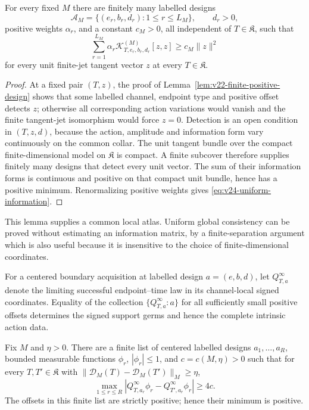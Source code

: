 \begin{lemma}
\label{lem:v24-uniform-positive-design}
For every fixed \(M\) there are finitely many labelled designs
\[
 \mathscr A_M=\{(e_r,b_r,d_r):1\le r\le L_M\},
 \qquad d_r>0,
\]
positive weights \(\alpha_r\), and a constant \(c_M>0\), all independent of
\(T\in\mathfrak K\), such that
\begin{equation}\label{eq:v24-uniform-information}
 \sum_{r=1}^{L_M}\alpha_r
   \mathcal K_{T,e_r,b_r,d_r}^{(M)}[z,z]
 \ge c_M\|z\|^2
\end{equation}
for every unit finite-jet tangent vector \(z\) at every
\(T\in\mathfrak K\).
\end{lemma}

\begin{proof}
At a fixed pair \((T,z)\), the proof of
Lemma~\ref{lem:v22-finite-positive-design} shows that some labelled channel,
endpoint type and positive offset detects \(z\); otherwise all corresponding
action variations would vanish and the finite tangent-jet isomorphism would
force \(z=0\).  Detection is an open condition in \((T,z,d)\), because the
action, amplitude and information form vary continuously on the common
collar.  The unit tangent bundle over the compact finite-dimensional model on
\(\mathfrak K\) is compact.  A finite subcover therefore supplies finitely
many designs that detect every unit vector.  The sum of their information
forms is continuous and positive on that compact unit bundle, hence has a
positive minimum.  Renormalizing positive weights gives
\eqref{eq:v24-uniform-information}.
\end{proof}

This lemma supplies a common local atlas.  Uniform global consistency can be
proved without estimating an information matrix, by a finite-separation
argument which is also useful because it is insensitive to the choice of
finite-dimensional coordinates.

For a centered boundary acquisition at labelled design
\(a=(e,b,d)\), let \(Q_{T,a}^{\infty}\) denote the limiting successful
endpoint--time law in its channel-local signed coordinates.  Equality of the
collection \(\{Q_{T,a}^{\infty}:a\}\) for all sufficiently small positive
offsets determines the signed support germs and hence the complete intrinsic
action data.

\begin{lemma}
\label{lem:v24-finite-separators}
Fix \(M\) and \(\eta>0\).  There are a finite list of centered labelled
designs \(a_1,\ldots,a_R\), bounded measurable functions
\(\phi_r\), \(|\phi_r|\le1\), and \(c=c(M,\eta)>0\) such that for every
\(T,T'\in\mathfrak K\) with
\(\|\mathcal D_M(T)-\mathcal D_M(T')\|_M\ge\eta\),
\begin{equation}\label{eq:v24-separator}
 \max_{1\le r\le R}
 \left|
   Q_{T,a_r}^{\infty}\phi_r-Q_{T',a_r}^{\infty}\phi_r
 \right|\ge4c.
\end{equation}
The offsets in this finite list are strictly positive; hence their minimum is
positive.
\end{lemma}

